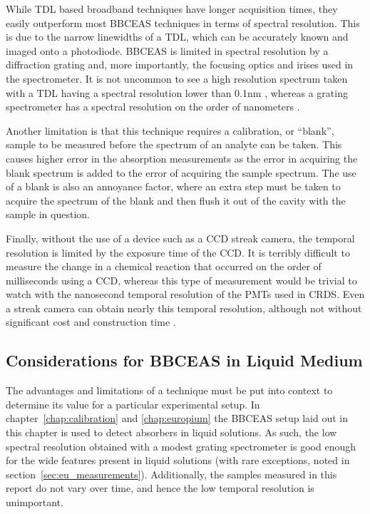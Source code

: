 
While \ac{TDL} based broadband techniques have longer acquisition times, they
easily outperform most \ac{BBCEAS} techniques in terms of spectral resolution.
This is due to the narrow linewidths of a \ac{TDL}, which can be accurately
known and imaged onto a photodiode.  \ac{BBCEAS} is limited in spectral
resolution by a diffraction grating and, more importantly, the focusing optics
and irises used in the spectrometer. It is not uncommon to see a high
resolution spectrum taken with a \ac{TDL} having a spectral resolution lower
than 0.1nm \cite{Wieman:2000vd}, whereas a grating spectrometer has a spectral
resolution on the order of nanometers \cite{Kiwanuka:2010bj}.

Another limitation is that this technique requires a calibration, or ``blank'',
sample to be measured before the spectrum of an analyte can be taken. This
causes higher error in the absorption measurements as the error in acquiring
the blank spectrum is added to the error of acquiring the sample spectrum. The
use of a blank is also an annoyance factor, where an extra step must be taken
to acquire the spectrum of the blank and then flush it out of the cavity with
the sample in question.

Finally, without the use of a device such as a \ac{CCD} streak camera, the
temporal resolution is limited by the exposure time of the \ac{CCD}. It is
terribly difficult to measure the change in a chemical reaction that occurred
on the order of milliseconds using a \ac{CCD}, whereas this type of measurement
would be trivial to watch with the nanosecond temporal resolution of the
\acp{PMT} used in \ac{CRDS}. Even a streak camera can obtain nearly this
temporal resolution, although not without significant cost and construction
time \cite{Velten:2011vq}.



\subsection{Considerations for BBCEAS in Liquid Medium}\label{subsec:bbceas_liq}

The advantages and limitations of a technique must be put into context
to determine its value for a particular experimental setup. In
chapter~\ref{chap:calibration} and \ref{chap:europium} the \ac{BBCEAS}
setup laid out in this chapter is used to detect absorbers in liquid
solutions. As such, the low spectral resolution obtained with a modest grating
spectrometer is good enough for the wide features present in liquid solutions
(with rare exceptions, noted in section~\ref{sec:eu_measurements}).
Additionally, the samples measured in this report do not vary over time, and
hence the low temporal resolution is unimportant.



